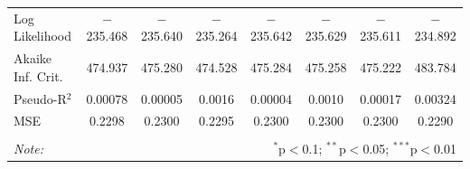\documentclass[12pt]{article}
\begin{document}
\begin{table}[!htbp]
\begin{adjustbox}{width=\textwidth}
\begin{tabular}{@{\extracolsep{5pt}}lccccccc}
Log Likelihood & $-$235.468 & $-$235.640 & $-$235.264 & $-$235.642 & $-$235.629 & $-$235.611 & $-$234.892 \\ 
Akaike Inf. Crit. & 474.937 & 475.280 & 474.528 & 475.284 & 475.258 & 475.222 & 483.784 \\ 
Pseudo-R$^{2}$ & 0.00078 & 0.00005 & 0.0016 & 0.00004 & 0.0010 & 0.00017 & 0.00324 \\
MSE & 0.2298 & 0.2300 & 0.2295 & 0.2300 & 0.2300 & 0.2300 & 0.2290 \\
\hline 
\hline \\[-1.8ex] 
\textit{Note:}  & \multicolumn{7}{r}{$^{*}$p$<$0.1; $^{**}$p$<$0.05; $^{***}$p$<$0.01} \\ 
\end{tabular}
\end{adjustbox}  
\end{table}
\end{document}
